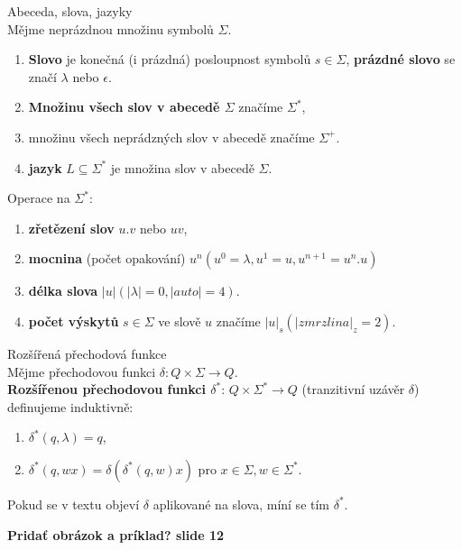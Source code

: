 \documentclass[../main.tex]{subfiles}
\begin{document}
\begin{definition}
    Abeceda, slova, jazyky\\
    Mějme neprázdnou množinu symbolů $\Sigma$.
    \begin{enumerate}
        \item \textbf{Slovo} je konečná (i prázdná) posloupnost symbolů $s \in \Sigma$, \textbf{prázdné slovo}
        se značí $\lambda$ nebo $\epsilon$.
        \item \textbf{Množinu všech slov v abecedě $\Sigma$} značíme $\Sigma^*$,
        \item množinu všech neprádzných slov v abecedě značíme  $\Sigma^+$.
        \item \textbf{jazyk} $L \subseteq \Sigma^*$ je množina slov v abecedě $\Sigma$. 
    \end{enumerate}
\end{definition}
\begin{definition}
    Operace na $\Sigma^*$:
    \begin{enumerate}
        \item \textbf{zřetězení slov} $u.v$ nebo $uv$,
        \item \textbf{mocnina} (počet opakování) $u^n (u^0 = \lambda, u^1 = u, u^{n+1} = u^n.u)$
        \item \textbf{délka slova} $|u| (|\lambda|=0,|auto|=4)$.
        \item \textbf{počet výskytů} $s \in \Sigma$ ve slově $u$ značíme $|u|_s (|zmrzlina|_z = 2)$.
    \end{enumerate}
\end{definition}

\begin{definition}
    Rozšířená přechodová funkce\\
    Mějme přechodovou funkci $\delta : Q \times \Sigma \rightarrow Q$.\\
    \textbf{Rozšířenou přechodovou funkci $\delta^*$}: $Q \times \Sigma^* \rightarrow Q$ (tranzitivní uzávěr $\delta$)\\
    definujeme induktivně:
    \begin{enumerate}
        \item $\delta^*(q,\lambda) = q$,
        \item $\delta^*(q,wx) = \delta(\delta^*(q,w)x)$ pro $x\in \Sigma, w \in \Sigma^*$.
    \end{enumerate} 
    \begin{remark}
        Pokud se v textu objeví $\delta$ aplikované na slova, míní se tím $\delta^*$.
    \end{remark}
    \textbf{Pridať obrázok a príklad? slide 12}
\end{definition}
\end{document}
